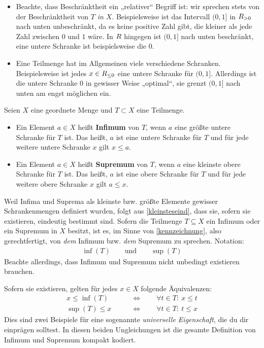 \begin{bem} \quad
    \begin{itemize}
        \item Beachte, dass Beschränktheit ein „relativer“ Begriff ist: wir sprechen stets von der Beschränktheit von $T$ \emph{in $X$}. Beispielsweise ist das Intervall $(0,1]$ in $\relax R_{>0}$ nach unten unbeschränkt, da es keine positive Zahl gibt, die kleiner als jede Zahl zwischen $0$ und $1$ wäre. In $\relax R$ hingegen ist $(0,1]$ nach unten beschränkt, eine untere Schranke ist beispielsweise die $0$.
        \item Eine Teilmenge hat im Allgemeinen viele verschiedene Schranken. Beispielsweise ist jedes $x\in \relax R_{\le 0}$ eine untere Schranke für $(0,1]$. Allerdings ist die untere Schranke $0$ in gewisser Weise „optimal“, sie grenzt $(0,1]$ nach unten am engst möglichen ein.
    \end{itemize}
\end{bem}


\begin{defin}  
    Seien $X$ eine geordnete Menge und $T\subset X$ eine Teilmenge.
    \begin{itemize}
        \item Ein Element $a\in X$ heißt \textbf{Infimum} von $T$, wenn $a$ eine größte untere Schranke für $T$ ist. Das heißt, $a$ ist eine untere Schranke für $T$ und für jede weitere untere Schranke $x$ gilt $x\le a$.
        \item Ein Element $a\in X$ heißt \textbf{Supremum} von $T$, wenn $a$ eine kleinste obere Schranke für $T$ ist. Das heißt, $a$ ist eine obere Schranke für $T$ und für jede weitere obere Schranke $x$ gilt $a\le x$.
    \end{itemize}
\end{defin}


\begin{nota}
    Weil Infima und Suprema als kleinste bzw. größte Elemente gewisser Schrankenmengen definiert wurden, folgt aus \cref{kleinsteseind}, dass sie, sofern sie existieren, eindeutig bestimmt sind. Sofern die Teilmenge $T\subseteq X$ ein Infimum oder ein Supremum in $X$ besitzt, ist es, im Sinne von \cref{kennzeichnung}, also gerechtfertigt, von \emph{dem} Infimum bzw. \emph{dem} Supremum zu sprechen. Notation:
    \begin{align*}
        \inf(T) \qquad\text{und}\qquad \sup(T)
    \end{align*}
    Beachte allerdings, dass Infimum und Supremum nicht unbedingt existieren brauchen.

    Sofern sie existieren, gelten für jedes $x\in X$ folgende Äquivalenzen:
    \begin{align*}
        x\le \inf(T) \qquad&\Leftrightarrow\qquad \forall t\in T:\ x\le t \\
        \sup(T)\le x \qquad&\Leftrightarrow\qquad \forall t\in T:\ t\le x
    \end{align*}
    Dies sind zwei Beispiele für eine sogenannte \emph{universelle Eigenschaft}, die du dir einprägen solltest. In diesen beiden Ungleichungen ist die gesamte Definition von Infimum und Supremum kompakt kodiert.
\end{nota}


